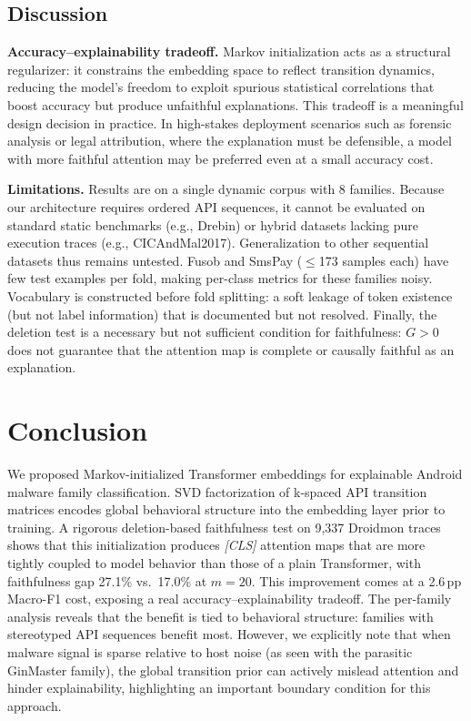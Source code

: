 \documentclass[12pt]{report}
\begin{document}
\subsection{Discussion}

\textbf{Accuracy--explainability tradeoff.}
Markov initialization acts as a structural regularizer: it constrains
the embedding space to reflect transition dynamics, reducing the model's
freedom to exploit spurious statistical correlations that boost accuracy
but produce unfaithful explanations. This tradeoff is a meaningful
design decision in practice. In high-stakes deployment scenarios such
as forensic analysis or legal attribution, where the explanation must
be defensible, a model with more faithful attention may be preferred
even at a small accuracy cost.

\textbf{Limitations.}
Results are on a single dynamic corpus with 8 families. Because our architecture requires ordered API sequences, it cannot be evaluated on standard static benchmarks (e.g., Drebin) or hybrid datasets lacking pure execution traces (e.g., CICAndMal2017). Generalization to other sequential datasets thus remains untested.
Fusob and SmsPay ($\leq$173 samples each) have few test examples per
fold, making per-class metrics for these families noisy.
Vocabulary is constructed before fold splitting: a soft leakage of
token existence (but not label information) that is documented but
not resolved.
Finally, the deletion test is a necessary but not sufficient condition
for faithfulness: $G > 0$ does not guarantee that the attention map is
complete or causally faithful as an explanation.

\section{Conclusion}

We proposed Markov-initialized Transformer embeddings for explainable
Android malware family classification. SVD factorization of k-spaced
API transition matrices encodes global behavioral structure into the
embedding layer prior to training. A rigorous deletion-based faithfulness
test on 9,337 Droidmon traces shows that this initialization produces
\textit{[CLS]} attention maps that are more tightly coupled to model
behavior than those of a plain Transformer, with faithfulness gap
27.1\% vs.\ 17.0\% at $m{=}20$. This improvement comes at a 2.6\,pp
Macro-F1 cost, exposing a real accuracy--explainability tradeoff.
The per-family analysis reveals that the benefit is tied to behavioral
structure: families with stereotyped API sequences benefit most. However, we explicitly note that when malware signal is sparse relative to host noise (as seen with the parasitic GinMaster family), the global transition prior can actively mislead attention and hinder explainability, highlighting an important boundary condition for this approach.
\end{document}
